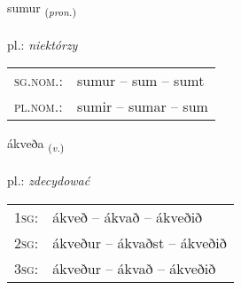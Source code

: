 \documentclass[frontgrid, backgrid]{flacards}\usepackage[]{graphicx}\usepackage[]{xcolor}
\begin{document}
\renewcommand{\blhead}{\vskip5pt {\small\bfseries\footnotesize Fornafn | zaimek }}
\renewcommand{\bcfoot}{\vskip5pt \hspace{2pt}{\small\bfseries\footnotesize 1K}}


{sumur \small{\textsubscript{(\textit{pron.})}} \\[1ex] %
\textphonetic{[sʏːmʏr]} \\
pl.: \emph{niektórzy} \\  [2ex]
\renewcommand*{\arraystretch}{0.8}
\begin{tabular}{ll}
\textsc{sg.nom.}: & sumur  --  sum -- sumt \\ 
\textsc{pl.nom.}: & sumir -- sumar -- sum
\end{tabular}
}

\renewcommand{\flhead}{\vskip5pt \fboxsep=0pt {\small\bfseries\footnotesize Sagnorð | czasownik}}
\renewcommand{\fcfoot}{\vskip5pt \fboxsep=0pt \hspace{2pt}{\small\bfseries\footnotesize 1K}}

\renewcommand{\blhead}{\vskip5pt {\small\bfseries\footnotesize Sagnorð | czasownik }}
\renewcommand{\bcfoot}{\vskip5pt \hspace{2pt}{\small\bfseries\footnotesize 1K}}


{ákveða \small{\textsubscript{(\textit{v.})}} \\[1ex] %
\textphonetic{[auːkʰvɛða]} \\
pl.: \emph{zdecydować} \\  [2ex]
\renewcommand*{\arraystretch}{0.8}
\begin{tabular}{p{1cm}l}
\textsc{1sg}: & ákveð -- ákvað -- ákveðið \\ 
\textsc{2sg}: & ákveður -- ákvaðst -- ákveðið \\ 
\textsc{3sg}: & ákveður -- ákvað -- ákveðið \\ 
\end{tabular}
}

\renewcommand{\flhead}{\vskip5pt \fboxsep=0pt {\small\bfseries\footnotesize Sagnorð | czasownik}}
\renewcommand{\fcfoot}{\vskip5pt \fboxsep=0pt \hspace{2pt}{\small\bfseries\footnotesize 1K}}
\end{document}
